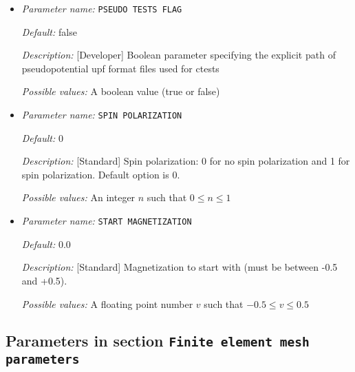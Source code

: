 \begin{itemize}
{\it Possible values:} Any string
\item {\it Parameter name:} {\tt PSEUDO TESTS FLAG}
\label{parameters:DFT functional related parameters/PSEUDO TESTS FLAG}
\label{parameters:DFT_20functional_20related_20parameters/PSEUDO_20TESTS_20FLAG}




{\it Default:} false


{\it Description:} [Developer] Boolean parameter specifying the explicit path of pseudopotential upf format files used for ctests


{\it Possible values:} A boolean value (true or false)
\item {\it Parameter name:} {\tt SPIN POLARIZATION}
\label{parameters:DFT functional related parameters/SPIN POLARIZATION}
\label{parameters:DFT_20functional_20related_20parameters/SPIN_20POLARIZATION}




{\it Default:} 0


{\it Description:} [Standard] Spin polarization: 0 for no spin polarization and 1 for spin polarization. Default option is 0.


{\it Possible values:} An integer $n$ such that $0\leq n \leq 1$
\item {\it Parameter name:} {\tt START MAGNETIZATION}
\label{parameters:DFT functional related parameters/START MAGNETIZATION}
\label{parameters:DFT_20functional_20related_20parameters/START_20MAGNETIZATION}




{\it Default:} 0.0


{\it Description:} [Standard] Magnetization to start with (must be between -0.5 and +0.5).


{\it Possible values:} A floating point number $v$ such that $-0.5 \leq v \leq 0.5$
\end{itemize}

\subsection{Parameters in section \tt Finite element mesh parameters}
\label{parameters:Finite_20element_20mesh_20parameters}

